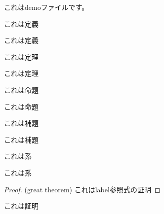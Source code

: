 \documentclass[a4paper]{jsarticle}
\begin{document}
  これはdemoファイルです。
  \begin{definition}[番号あり定義]
    これは定義
  \end{definition}
  \begin{definition*}[番号なし定義]
    これは定義
  \end{definition*}
  \begin{theorem}[番号あり定理]\label{great theorem}
    これは定理
  \end{theorem}
  \begin{theorem*}[番号なし定理]
    これは定理
  \end{theorem*}
  \begin{proposition}[番号あり命題]
    これは命題
  \end{proposition}
  \begin{proposition*}[番号なし命題]
    これは命題
  \end{proposition*}
  \begin{lemma}[番号あり補題]
    これは補題
  \end{lemma}
  \begin{lemma*}[番号なし補題]
    これは補題
  \end{lemma*}
  \begin{corollary}[番号あり系]
    これは系
  \end{corollary}
  \begin{corollary*}[番号なし系]
    これは系
  \end{corollary*}
  \begin{proof}(great theorem)
    これはlabel参照式の証明
  \end{proof}
  \begin{proof*}
    これは証明
  \end{proof*}
\end{document}
